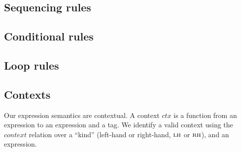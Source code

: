 \documentclass{llncs}
\begin{document}
{\subsection{Sequencing rules}

\sequencing

\subsection{Conditional rules}

\conditionals

\subsection{Loop rules}

\loops

\subsection{Contexts}
\label{app:contexts}

Our expression semantics are contextual. A context \(\mathit{ctx}\) is a function from an
expression to an expression and a tag. We identify a valid context using the \(\mathit{context}\)
relation over a ``kind'' (left-hand or right-hand, \(\textnormal{\sc lh}\) or \(\textnormal{\sc rh}\)),
and an expression.

}
\end{document}
